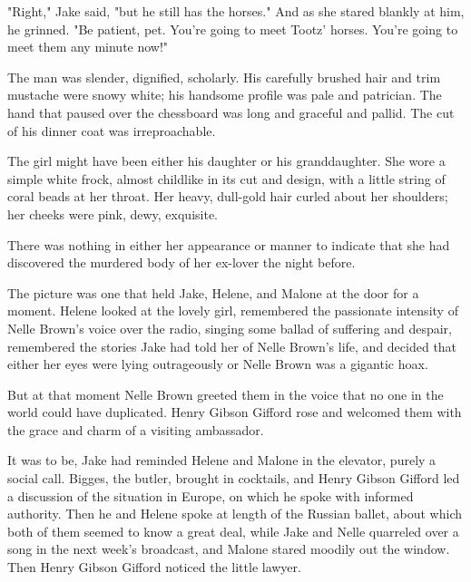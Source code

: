 \documentclass{novel}
\begin{document}
"Right," Jake said, "but he still has the horses." And as she stared blankly at him, he grinned. "Be patient, pet. You’re going to meet Tootz’ horses. You’re going to meet them any minute now!"

\vspace{2\nbs}
\clearpage
\thispagestyle{empty}

\begin{ChapterStart}
\vspace{3\nbs}
\end{ChapterStart}

The man was slender, dignified, scholarly. His carefully brushed hair and trim mustache were snowy white; his handsome profile was pale and patrician. The hand that paused over the chessboard was long and graceful and pallid. The cut of his dinner coat was irreproachable.

The girl might have been either his daughter or his granddaughter. She wore a simple white frock, almost childlike in its cut and design, with a little string of coral beads at her throat. Her heavy, dull-gold hair curled about her shoulders; her cheeks were pink, dewy, exquisite.

There was nothing in either her appearance or manner to indicate that she had discovered the murdered body of her ex-lover the night before.

The picture was one that held Jake, Helene, and Malone at the door for a moment. Helene looked at the lovely girl, remembered the passionate intensity of Nelle Brown’s voice over the radio, singing some ballad of suffering and despair, remembered the stories Jake had told her of Nelle Brown’s life, and decided that either her eyes were lying outrageously or Nelle Brown was a gigantic hoax.

But at that moment Nelle Brown greeted them in the voice that no one in the world could have duplicated. Henry Gibson Gifford rose and welcomed them with the grace and charm of a visiting ambassador.

It was to be, Jake had reminded Helene and Malone in the elevator, purely a social call. Bigges, the butler, brought in cocktails, and Henry Gibson Gifford led a discussion of the situation in Europe, on which he spoke with informed authority. Then he and Helene spoke at length of the Russian ballet, about which both of them seemed to know a great deal, while Jake and Nelle quarreled over a song in the next week’s broadcast, and Malone stared moodily out the window. Then Henry Gibson Gifford noticed the little lawyer.
\end{document}

